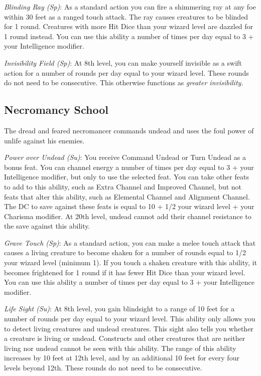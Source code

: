 \textit{Blinding Ray (Sp)}: As a standard action you can fire a shimmering ray at any foe within 30 feet as a ranged touch attack. The ray causes creatures to be blinded for 1 round. Creatures with more Hit Dice than your wizard level are dazzled for 1 round instead. You can use this ability a number of times per day equal to 3 + your Intelligence modifier.
				
\textit{Invisibility Field (Sp)}: At 8th level, you can make yourself invisible as a swift action for a number of rounds per day equal to your wizard level. These rounds do not need to be consecutive. This otherwise functions as \textit{greater invisibility.}
				
\subsection{Necromancy School}

				
The dread and feared necromancer commands undead and uses the foul power of unlife against his enemies.
				
\textit{Power over Undead (Su)}: You receive Command Undead or Turn Undead as a bonus feat. You can channel energy a number of times per day equal to 3 + your Intelligence modifier, but only to use the selected feat. You can take other feats to add to this ability, such as Extra Channel and Improved Channel, but not feats that alter this ability, such as Elemental Channel and Alignment Channel. The DC to save against these feats is equal to 10 + 1/2 your wizard level + your Charisma modifier. At 20th level, undead cannot add their channel resistance to the save against this ability.
				
\textit{Grave Touch (Sp)}: As a standard action, you can make a melee touch attack that causes a living creature to become shaken for a number of rounds equal to 1/2 your wizard level (minimum 1). If you touch a shaken creature with this ability, it becomes frightened for 1 round if it has fewer Hit Dice than your wizard level. You can use this ability a number of times per day equal to 3 + your Intelligence modifier.
				
\textit{Life Sight (Su)}: At 8th level, you gain blindsight to a range of 10 feet for a number of rounds per day equal to your wizard level. This ability only allows you to detect living creatures and undead creatures. This sight also tells you whether a creature is living or undead. Constructs and other creatures that are neither living nor undead cannot be seen with this ability. The range of this ability increases by 10 feet at 12th level, and by an additional 10 feet for every four levels beyond 12th. These rounds do not need to be consecutive.
				
